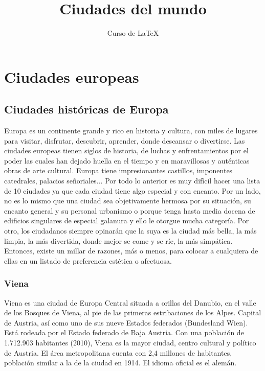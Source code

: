 \documentclass[letterpaper, 11 pt,oneside]{book}
\title{Ciudades del mundo}
\author{Curso de \LaTeX}
\begin{document}
\maketitle
\part{Ciudades europeas}
    \chapter{Ciudades históricas de Europa}
   	Europa es un continente grande y rico en historia y cultura, con miles de lugares para visitar, disfrutar, descubrir, aprender, donde descansar o divertirse. Las ciudades europeas tienen siglos de historia, de luchas y enfrentamientos por el poder las cuales han dejado huella en el tiempo y en maravillosas y auténticas obras de arte cultural. Europa tiene impresionantes castillos, imponentes catedrales, palacios señoriales... Por todo lo anterior es muy difícil hacer una lista de 10 ciudades ya que cada ciudad tiene algo especial y con encanto. Por un lado, no es lo mismo que una ciudad sea objetivamente hermosa por su situación, su encanto general y su personal urbanismo o porque tenga hasta media docena de edificios singulares de especial galanura y ello le otorgue mucha categoría. Por otro, los ciudadanos siempre opinarán que la suya es la ciudad más bella, la más limpia, la más divertida, donde mejor se come y se ríe, la más simpática. Entonces, existe un millar de razones, más o menos, para colocar a cualquiera de ellas en un listado de preferencia estética o afectuosa.
   	
	    \section{Viena}
        Viena es una ciudad de Europa Central situada a orillas del Danubio, en el valle de los Bosques de Viena, al pie de las primeras estribaciones de los Alpes. Capital de Austria, así como uno de sus nueve Estados federados (Bundesland Wien).\\
 
        Está rodeada por el Estado federado de Baja Austria. Con una población de 1.712.903 habitantes (2010), Viena es la mayor ciudad, centro cultural y político de Austria. El área metropolitana cuenta con 2,4 millones de habitantes, población similar a la de la ciudad en 1914. El idioma oficial es el alemán.\\
 
\end{document}
